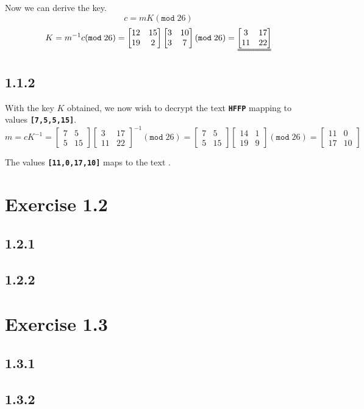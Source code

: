 \documentclass[11pt]{report}
\begin{document}
Now we can derive the key.
$$c = mK (\mathtt{mod}\;26)$$
$$K = m^{-1}c (\mathtt{mod}\;26) = \begin{bmatrix}
		12 & 15\\
		19 & 2
	\end{bmatrix} \begin{bmatrix}
		3 & 10\\
		3 & 7
	\end{bmatrix} (\mathtt{mod}\;26) = \uuline{\begin{bmatrix}
		3 & 17\\
		11 & 22
	\end{bmatrix}}$$


\subsection*{1.1.2}
With the key $K$ obtained, we now wish to decrypt the text {\tt\bfseries HFFP} mapping to values {\tt\bfseries [7,5,5,15]}.
$$m = cK^{-1} = \begin{bmatrix}
		7 & 5\\
		5 & 15
	\end{bmatrix} \begin{bmatrix}
		3 & 17\\
		11 & 22
	\end{bmatrix}^{-1} (\mathtt{mod}\;26) = \begin{bmatrix}
		7 & 5\\
		5 & 15
	\end{bmatrix} \begin{bmatrix}
		14 & 1\\
		19 & 9
	\end{bmatrix} (\mathtt{mod}\;26) = \begin{bmatrix}
		11 & 0\\
		17 & 10
	\end{bmatrix}$$

The values {\tt\bfseries [11,0,17,10]} maps to the text .

\section*{Exercise 1.2}
\subsection*{1.2.1}

\subsection*{1.2.2}

\section*{Exercise 1.3}
\subsection*{1.3.1}

\subsection*{1.3.2}
\end{document}
